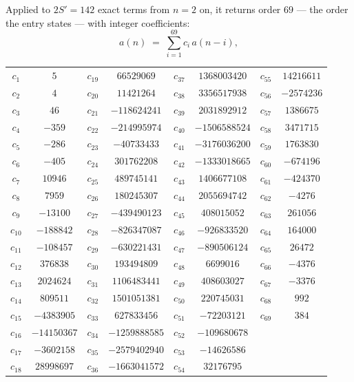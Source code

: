 \documentclass[11pt,a4paper]{article}
\theoremstyle{plain}
\theoremstyle{definition}
\begin{document}
Applied to $2S'=142$ exact terms from $n=2$ on, it returns order $69$ --- the
order the entry states --- with integer coefficients:
\[
a(n)\;=\;\sum_{i=1}^{69}c_i\,a(n-i),
\]
\begin{center}\small
\begin{tabular}{cccccccc}
$c_{1}$ & $5$ & $c_{19}$ & $66529069$ & $c_{37}$ & $1368003420$ & $c_{55}$ & $14216611$ \\
$c_{2}$ & $4$ & $c_{20}$ & $11421264$ & $c_{38}$ & $3356517938$ & $c_{56}$ & $-2574236$ \\
$c_{3}$ & $46$ & $c_{21}$ & $-118624241$ & $c_{39}$ & $2031892912$ & $c_{57}$ & $1386675$ \\
$c_{4}$ & $-359$ & $c_{22}$ & $-214995974$ & $c_{40}$ & $-1506588524$ & $c_{58}$ & $3471715$ \\
$c_{5}$ & $-286$ & $c_{23}$ & $-40733433$ & $c_{41}$ & $-3176036200$ & $c_{59}$ & $1763830$ \\
$c_{6}$ & $-405$ & $c_{24}$ & $301762208$ & $c_{42}$ & $-1333018665$ & $c_{60}$ & $-674196$ \\
$c_{7}$ & $10946$ & $c_{25}$ & $489745141$ & $c_{43}$ & $1406677108$ & $c_{61}$ & $-424370$ \\
$c_{8}$ & $7959$ & $c_{26}$ & $180245307$ & $c_{44}$ & $2055694742$ & $c_{62}$ & $-4276$ \\
$c_{9}$ & $-13100$ & $c_{27}$ & $-439490123$ & $c_{45}$ & $408015052$ & $c_{63}$ & $261056$ \\
$c_{10}$ & $-188842$ & $c_{28}$ & $-826347087$ & $c_{46}$ & $-926833520$ & $c_{64}$ & $164000$ \\
$c_{11}$ & $-108457$ & $c_{29}$ & $-630221431$ & $c_{47}$ & $-890506124$ & $c_{65}$ & $26472$ \\
$c_{12}$ & $376838$ & $c_{30}$ & $193494809$ & $c_{48}$ & $6699016$ & $c_{66}$ & $-4376$ \\
$c_{13}$ & $2024624$ & $c_{31}$ & $1106483441$ & $c_{49}$ & $408603027$ & $c_{67}$ & $-3376$ \\
$c_{14}$ & $809511$ & $c_{32}$ & $1501051381$ & $c_{50}$ & $220745031$ & $c_{68}$ & $992$ \\
$c_{15}$ & $-4383905$ & $c_{33}$ & $627833456$ & $c_{51}$ & $-72203121$ & $c_{69}$ & $384$ \\
$c_{16}$ & $-14150367$ & $c_{34}$ & $-1259888585$ & $c_{52}$ & $-109680678$ &  &  \\
$c_{17}$ & $-3602158$ & $c_{35}$ & $-2579402940$ & $c_{53}$ & $-14626586$ &  &  \\
$c_{18}$ & $28998697$ & $c_{36}$ & $-1663041572$ & $c_{54}$ & $32176795$ &  &  \\
\end{tabular}
\end{center}
\end{document}
